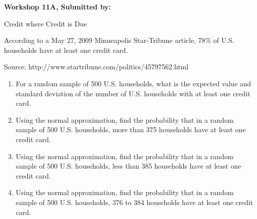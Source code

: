\documentclass[11pt]{book}\usepackage[]{graphicx}\usepackage[]{color}
\begin{document}
\begin{exercises}
\begin{exercise}
\end{exercise}
\begin{solution}  %

\end{solution}

\clearpage

    \begin{exercise}  %

    \begin{center}
\begin{flushleft}\textbf{\large \hfill Workshop 11A, Submitted by: }\end{flushleft}

\end{center}

Credit where Credit is Due

According to a May 27, 2009 Minneapolis Star-Tribune article, 78\% of U.S. households have at least one credit card.

Source: http://www.startribune.com/politics/45797562.html

\begin{enumerate}
  \item For a random sample of 500 U.S. households, what is the expected value and standard deviation of the number of U.S. households with at least one credit card.
  \item Using the normal approximation, find the probability that in a random sample of 500 U.S. households, more than 375 households have at least one credit card.
  \item Using the normal approximation, find the probability that in a random sample of 500 U.S. households, less than 385 households have at least one credit card.
  \item Using the normal approximation, find the probability that in a random sample of 500 U.S. households, 376 to 384 households have at least one credit card.
\end{enumerate}


\end{exercise}
\end{exercises}
\end{document}

